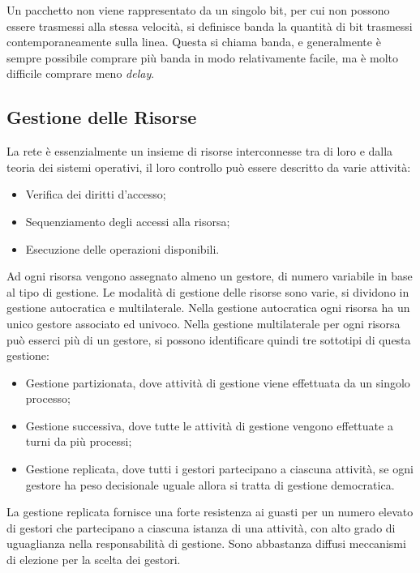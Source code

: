\documentclass{article}
\numberwithin{equation}{subsection}
\begin{document}
Un pacchetto non viene rappresentato da un singolo bit, per cui non possono essere trasmessi alla stessa velocità, si definisce banda la quantità di bit trasmessi 
contemporaneamente sulla linea. Questa si chiama banda, e generalmente è sempre possibile comprare più banda in modo relativamente facile, ma è molto difficile comprare meno \textit{delay}. 

\subsection{Gestione delle Risorse}

La rete è essenzialmente un insieme di risorse interconnesse tra di loro e dalla teoria dei sistemi operativi, il loro controllo può essere descritto da varie attività:
\begin{itemize}
    \item Verifica dei diritti d'accesso;
    \item Sequenziamento degli accessi alla risorsa;
    \item Esecuzione delle operazioni disponibili. 
\end{itemize}

Ad ogni risorsa vengono assegnato almeno un gestore, di numero variabile in base al tipo di gestione. 
Le modalità di gestione delle risorse sono varie, si dividono in gestione autocratica e multilaterale. Nella gestione autocratica ogni risorsa ha un unico gestore 
associato ed univoco. Nella gestione multilaterale per ogni risorsa può esserci più di un gestore, si possono identificare quindi tre sottotipi di questa gestione:
\begin{itemize}
    \item Gestione partizionata, dove attività di gestione viene effettuata da un singolo processo;
    \item Gestione successiva, dove tutte le attività di gestione vengono effettuate a turni da più processi;
    \item Gestione replicata, dove tutti i gestori partecipano a ciascuna attività, se ogni gestore ha peso decisionale uguale allora si tratta di gestione democratica. 
\end{itemize}

La gestione replicata fornisce una forte resistenza ai guasti per un numero elevato di gestori che partecipano a ciascuna istanza di una attività, con alto grado di 
uguaglianza nella responsabilità di gestione. Sono abbastanza diffusi meccanismi di elezione per la scelta dei gestori. 
\end{document}
